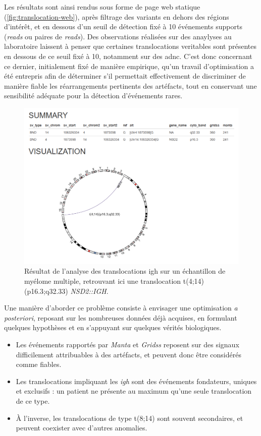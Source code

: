 \vspace{1em}

Les résultats sont ainsi rendus sous forme de page web statique (\autoref{fig:translocation-web}), après filtrage des variants en dehors des régions d'intérêt, et en dessous d'un seuil 
de détection fixé à 10 événements supports (\textit{reads} ou paires de \textit{reads}). Des observations réalisées sur des anaylyses au laboratoire 
laissent à penser que certaines translocations veritables sont présentes en dessous de ce seuil fixé à 10, notamment sur des \gls{adnc}.
C'est donc concernant ce dernier, initialement fixé de manière empirique, qu'un travail d'optimisation a été entrepris afin de déterminer 
s'il permettait effectivement de discriminer de manière fiable les réarrangements pertinents des artéfacts, tout en conservant une sensibilité adéquate 
pour la détection d'événements rares. 

\begin{figure}[H]
    \centering
    \includegraphics[width=1\textwidth]{images/translocation_web.png}
    \caption{
        Résultat de l'analyse des translocations \gls{igh} sur un échantillon de myélome multiple, 
        retrouvant ici une translocation t(4;14)(p16.3;q32.33) \textit{NSD2::IGH}.
        }
    \label{fig:translocation-web}
\end{figure}

Une manière d'aborder ce problème consiste à envisager une optimisation \textit{a posteriori}, reposant sur les nombreuses données déjà acquises, 
en formulant quelques hypothèses et en s'appuyant sur quelques vérités biologiques.

\begin{itemize}
    \item Les événements rapportés par \textit{Manta} et \textit{Gridss} reposent sur des signaux difficilement attribuables à des artéfacts, et peuvent donc être considérés comme fiables.
    \item Les translocations impliquant les \textit{\gls{igh}} sont des événements fondateurs, uniques et exclusifs : un patient ne présente au maximum qu'une seule translocation de ce type.
    \item À l'inverse, les translocations de type t(8;14) sont souvent secondaires, et peuvent coexister avec d'autres anomalies.
\end{itemize}

